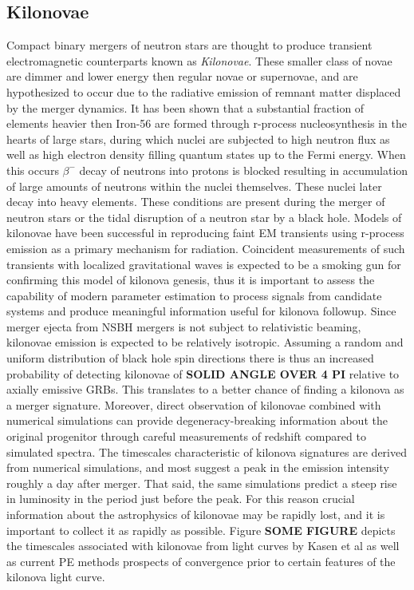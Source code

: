 \subsection{Kilonovae}
Compact binary mergers of neutron stars are thought to produce transient electromagnetic counterparts known as \textit{Kilonovae}. These smaller class of novae are dimmer and lower energy then regular novae or supernovae, and are hypothesized to occur due to the radiative emission of remnant matter displaced by the merger dynamics. It has been shown that a substantial fraction of elements heavier then Iron-56 are formed through r-process nucleosynthesis in the hearts of large stars, during which nuclei are subjected to high neutron flux as well as high electron density filling quantum states up to the Fermi energy. When this occurs $\beta^-$ decay of neutrons into protons is blocked \cite{r-proc} resulting in accumulation of large amounts of neutrons within the nuclei themselves. These nuclei later decay into heavy elements. These conditions are present during the merger of neutron stars or the tidal disruption of a neutron star by a black hole. Models of kilonovae have been successful in reproducing faint EM transients using r-process emission as a primary mechanism for radiation. Coincident measurements of such transients with localized gravitational waves is expected to be a smoking gun for confirming this model of kilonova genesis, thus it is important to assess the capability of modern parameter estimation to process signals from candidate systems and produce meaningful information useful for kilonova followup. 
Since merger ejecta from NSBH mergers is not subject to relativistic beaming, kilonovae emission is expected to be relatively isotropic. Assuming a random and uniform distribution of black hole spin directions there is thus an increased probability of detecting kilonovae of \textbf{SOLID ANGLE OVER 4 PI} relative to axially emissive GRBs. This translates to a better chance of finding a kilonova as a merger signature. Moreover, direct observation of kilonovae combined with numerical simulations can provide degeneracy-breaking information about the original progenitor through careful measurements of redshift compared to simulated spectra.   
The timescales characteristic of kilonova signatures are derived from numerical simulations, and most suggest a peak in the emission intensity roughly a day after merger. That said, the same simulations predict a steep rise in luminosity in the period just before the peak. For this reason crucial information about the astrophysics of kilonovae may be rapidly lost, and it is important to collect it as rapidly as possible. Figure \textbf{SOME FIGURE} depicts the timescales associated with kilonovae from light curves by Kasen et al \cite{kilonova} as well as current PE methods prospects of convergence prior to certain features of the kilonova light curve.

